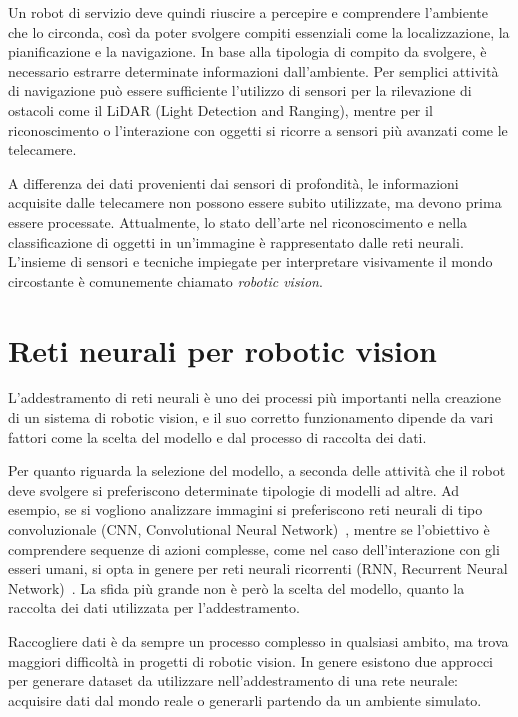 \documentclass[12pt]{report}
\begin{document}
Un robot di servizio deve quindi riuscire a percepire e comprendere l'ambiente che lo circonda, così da poter svolgere compiti essenziali come la localizzazione, la pianificazione e la navigazione. In base alla tipologia di compito da svolgere, è necessario estrarre determinate informazioni dall'ambiente. Per semplici attività di navigazione può essere sufficiente l'utilizzo di sensori per la rilevazione di ostacoli come il LiDAR (Light Detection and Ranging), mentre per il riconoscimento o l'interazione con oggetti si ricorre a sensori più avanzati come le telecamere.

A differenza dei dati provenienti dai sensori di profondità, le informazioni acquisite dalle telecamere non possono essere subito utilizzate, ma devono prima essere processate. Attualmente, lo stato dell'arte nel riconoscimento e nella classificazione di oggetti in un'immagine è rappresentato dalle reti neurali. L'insieme di sensori e tecniche impiegate per interpretare visivamente il mondo circostante è comunemente chiamato \textit{robotic vision}.

\section{Reti neurali per robotic vision}
\label{sec:raccolta_dati}

L'addestramento di reti neurali è uno dei processi più importanti nella creazione di un sistema di robotic vision, e il suo corretto funzionamento dipende da vari fattori come la scelta del modello e dal processo di raccolta dei dati.

Per quanto riguarda la selezione del modello, a seconda delle attività che il robot deve svolgere si preferiscono determinate tipologie di modelli ad altre. Ad esempio, se si vogliono analizzare immagini si preferiscono reti neurali di tipo convoluzionale (CNN, Convolutional Neural Network)~\cite{oshea2015introductionconvolutionalneuralnetworks}, mentre se l'obiettivo è comprendere sequenze di azioni complesse, come nel caso dell'interazione con gli esseri umani, si opta in genere per reti neurali ricorrenti (RNN, Recurrent Neural Network)~\cite{ZHANG20209}. La sfida più grande non è però la scelta del modello, quanto la raccolta dei dati utilizzata per l'addestramento.

Raccogliere dati è da sempre un processo complesso in qualsiasi ambito, ma trova maggiori difficoltà in progetti di robotic vision. In genere esistono due approcci per generare dataset da utilizzare nell'addestramento di una rete neurale: acquisire dati dal mondo reale o generarli partendo da un ambiente simulato.
\end{document}
